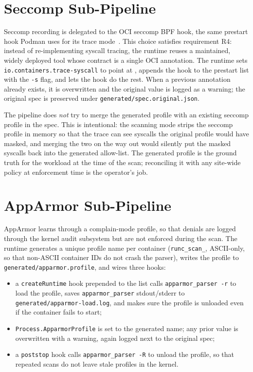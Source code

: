 \section{Seccomp Sub-Pipeline}\label{sec:design-seccomp}

Seccomp recording is delegated to the OCI seccomp BPF hook, the same prestart hook Podman uses for its trace mode~\cite{ociseccompbpfhook}. This choice satisfies requirement R4: instead of re-implementing syscall tracing, the runtime reuses a maintained, widely deployed tool whose contract is a single OCI annotation. The runtime sets \texttt{io.containers.trace-syscall} to point at , appends the hook to the prestart list with the \texttt{-s} flag, and lets the hook do the rest. When a previous annotation already exists, it is overwritten and the original value is logged as a warning; the original spec is preserved under \texttt{generated/spec.original.json}.

The pipeline does \emph{not} try to merge the generated profile with an existing seccomp profile in the spec. This is intentional: the scanning mode strips the seccomp profile in memory so that the trace can see syscalls the original profile would have masked, and merging the two on the way out would silently put the masked syscalls back into the generated allow-list. The generated profile is the ground truth for the workload at the time of the scan; reconciling it with any site-wide policy at enforcement time is the operator's job.

\section{AppArmor Sub-Pipeline}\label{sec:design-aa}

AppArmor learns through a complain-mode profile, so that denials are logged through the kernel audit subsystem but are not enforced during the scan. The runtime generates a unique profile name per container (\texttt{runc\_scan\_<sanitised-id>}, ASCII-only, so that non-ASCII container IDs do not crash the parser), writes the profile to \texttt{generated/apparmor.profile}, and wires three hooks:

\begin{itemize}
    \item a \texttt{createRuntime} hook prepended to the list calls \texttt{apparmor\_parser -r} to load the profile, saves \texttt{apparmor\_parser} stdout/stderr to \texttt{generated/apparmor-load.log}, and makes sure the profile is unloaded even if the container fails to start;
    \item \texttt{Process.ApparmorProfile} is set to the generated name; any prior value is overwritten with a warning, again logged next to the original spec;
    \item a \texttt{poststop} hook calls \texttt{apparmor\_parser -R} to unload the profile, so that repeated scans do not leave stale profiles in the kernel.
\end{itemize}

